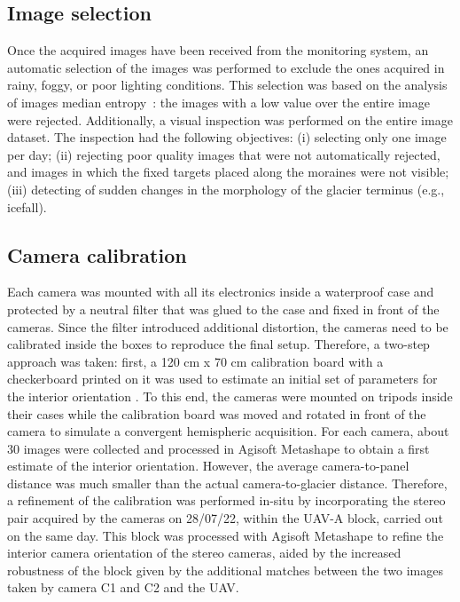 \subsection{Image selection}\label{sec:imageselection}

Once the acquired images have been received from the monitoring system, an
automatic selection of the images was performed to exclude the ones acquired in rainy,
foggy, or poor lighting conditions.
This selection was based on the analysis of images median
entropy~\citep{tsai2008entropy}:
the images with a low value over the entire image were rejected.
Additionally, a visual inspection was performed on the entire image dataset.
The inspection had the following objectives:
(i) selecting only one image per day;
(ii) rejecting poor quality images that were not automatically rejected,
and images in which the fixed targets placed along the moraines were not visible;
(iii) detecting of sudden changes in the morphology of the glacier
terminus (e.g., icefall).

\subsection{Camera calibration}\label{sec:cameracalibration}

Each camera was mounted with all its electronics inside a waterproof case and protected
by a neutral filter that was glued to the case and fixed in front of the cameras.
Since the filter introduced additional distortion, the cameras need to be calibrated
inside the boxes to reproduce the final setup.
Therefore, a two-step approach was taken: first, a 120 cm x 70 cm calibration board with
a checkerboard printed on it was used to estimate an initial set of parameters for the
interior orientation \citep{zhang_flexible_2000}.
To this end, the cameras were mounted on tripods inside their cases while the calibration
board was moved and rotated in front of the camera to simulate a convergent hemispheric
acquisition.
For each camera, about 30 images were collected and processed in Agisoft Metashape to
obtain a first estimate of the interior orientation.
However, the average camera-to-panel distance was much smaller than the actual
camera-to-glacier distance.
Therefore, a refinement of the calibration was performed in-situ by incorporating the
stereo pair acquired by the cameras on 28/07/22, within the UAV-A block, carried out on
the same day.
This block was processed with Agisoft Metashape to refine the interior camera
orientation of the stereo cameras, aided by the increased robustness of the block given
by the additional matches between the two images taken by camera C1 and C2 and the UAV.

